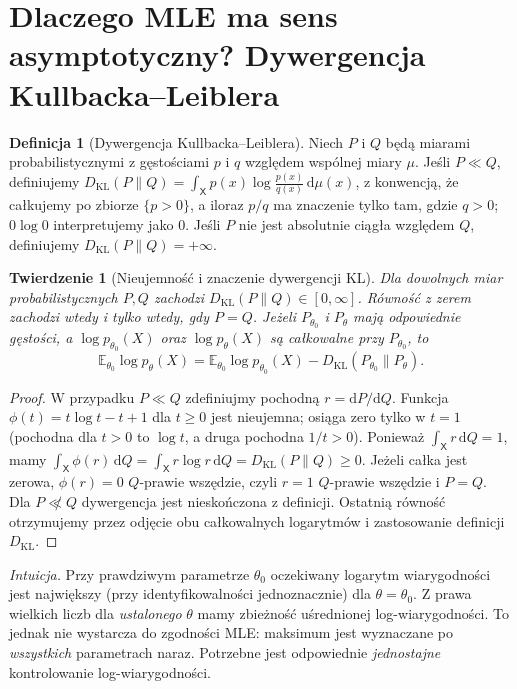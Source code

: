 \documentclass[11pt,a4paper,oneside]{report}
\numberwithin{equation}{chapter}
\theoremstyle{plain}
\newtheorem{twierdzenie}{Twierdzenie}[chapter]
\theoremstyle{definition}
\newtheorem{definicja}{Definicja}[chapter]
\theoremstyle{remark}
\newcommand{\E}{\mathbb E}
\newcommand{\dd}{\mathrm d}
\begin{document}
\section{Dlaczego MLE ma sens asymptotyczny? Dywergencja Kullbacka--Leiblera}
\begin{definicja}[Dywergencja Kullbacka--Leiblera]\label{def:kl}
Niech $P$ i $Q$ będą miarami probabilistycznymi z gęstościami $p$ i $q$
względem wspólnej miary $\mu$. Jeśli $P\ll Q$, definiujemy
$D_{\mathrm{KL}}(P\|Q)=\int_{\mathsf X}p(x)\log\frac{p(x)}{q(x)}\,\dd\mu(x)$,
z konwencją, że całkujemy po zbiorze $\{p>0\}$, a iloraz
$p/q$ ma znaczenie tylko tam, gdzie $q>0$; $0\log0$ interpretujemy jako $0$.
Jeśli $P$ nie jest absolutnie ciągła względem $Q$, definiujemy
$D_{\mathrm{KL}}(P\|Q)=+\infty$.
\end{definicja}
\begin{twierdzenie}[Nieujemność i znaczenie dywergencji KL]\label{thm:kl-basic}
Dla dowolnych miar probabilistycznych $P,Q$ zachodzi
$D_{\mathrm{KL}}(P\|Q)\in[0,\infty]$. Równość z zerem zachodzi wtedy
i tylko wtedy, gdy $P=Q$. Jeżeli $P_{\theta_0}$ i $P_\theta$ mają
odpowiednie gęstości, a $\log p_{\theta_0}(X)$ oraz
$\log p_\theta(X)$ są całkowalne przy $P_{\theta_0}$, to
\[
\E_{\theta_0}\log p_\theta(X)
=\E_{\theta_0}\log p_{\theta_0}(X)
-D_{\mathrm{KL}}(P_{\theta_0}\|P_\theta).
\]
\end{twierdzenie}
\begin{proof}
W przypadku $P\ll Q$ zdefiniujmy pochodną $r=\dd P/\dd Q$.
Funkcja $\phi(t)=t\log t-t+1$ dla $t\ge0$ jest nieujemna;
osiąga zero tylko w $t=1$ (pochodna dla $t>0$ to $\log t$, a druga
pochodna $1/t>0$). Ponieważ $\int_{\mathsf X}r\,\dd Q=1$, mamy
$\int_{\mathsf X}\phi(r)\,\dd Q=\int_{\mathsf X}r\log r\,\dd Q=D_{\mathrm{KL}}(P\|Q)\ge0$.
Jeżeli całka jest zerowa, $\phi(r)=0$ $Q$-prawie wszędzie,
czyli $r=1$ $Q$-prawie wszędzie i $P=Q$.
Dla $P\not\ll Q$ dywergencja jest nieskończona z definicji.
Ostatnią równość otrzymujemy przez odjęcie obu całkowalnych logarytmów
i zastosowanie definicji $D_{\mathrm{KL}}$.
\end{proof}

\emph{Intuicja.} Przy prawdziwym parametrze $\theta_0$ oczekiwany
logarytm wiarygodności jest największy (przy identyfikowalności jednoznacznie)
dla $\theta=\theta_0$. Z prawa wielkich liczb dla \emph{ustalonego}
$\theta$ mamy zbieżność uśrednionej log-wiarygodności. To jednak nie
wystarcza do zgodności MLE: maksimum jest wyznaczane po \emph{wszystkich}
parametrach naraz. Potrzebne jest odpowiednie \emph{jednostajne}
kontrolowanie log-wiarygodności.
\end{document}
